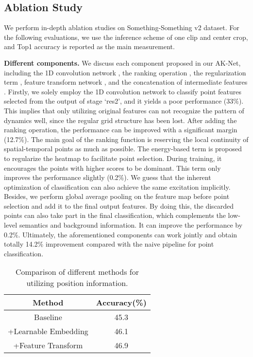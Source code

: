 \documentclass[journal]{IEEEtran}
\begin{document}
\subsection{Ablation Study} \label{sec:ablation}
We perform in-depth ablation studies on Something-Something v2 dataset.
For the following evaluations, we use the inference scheme of one clip and center crop, and Top1 accuracy is reported as the main measurement.

\textbf{Different components.}
We discuss each component proposed in our AK-Net, including the 1D convolution network , the ranking operation , the regularization term , feature transform network , and the concatenation of intermediate features .
Firstly, we solely employ the 1D convolution network to classify point features selected from the output of stage `res2', and it yields a poor performance (33\%).
This implies that only utilizing original features can not recognize the pattern of dynamics well, since the regular grid structure has been lost.
After adding the ranking operation, the performance can be improved with a significant margin (12.7\%). 
The main goal of the ranking function is reserving the local continuity of spatial-temporal points as much as possible.
The energy-based term is proposed to regularize the heatmap to facilitate point selection.
During training, it encourages the points with higher scores to be dominant.
This term only improves the performance slightly (0.2\%).
We guess that the inherent optimization of classification can also achieve the same excitation implicitly.
Besides, we perform global average pooling on the feature map before point selection and add it to the final output features.
By doing this, the discarded points can also take part in the final classification, which complements the low-level semantics and background information.
It can improve the performance by 0.2\%.
Ultimately, the aforementioned components can work jointly and obtain totally 14.2\% improvement compared with the naive pipeline for point classification.

\begin{table}[ht]
    \centering
    \caption{Comparison of different methods for utilizing position information.}
    \label{tab:position}
    \begin{tabular}{cc} \hline
        Method & Accuracy(\%) \\ \hline
        Baseline & 45.3 \\
        +Learnable Embedding & 46.1 \\
        +Feature Transform & 46.9 \\ \hline
    \end{tabular}
\end{table}
\end{document}
